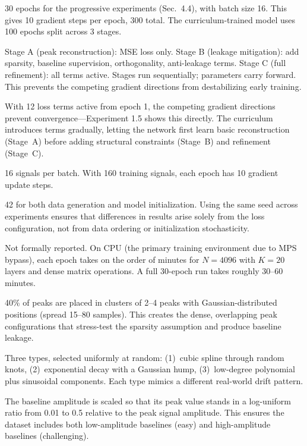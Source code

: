 \documentclass[11pt, letterpaper]{article}
\begin{document}
{30 epochs for the progressive experiments (Sec.~4.4), with batch size 16.  This gives 10 gradient steps per epoch, 300 total.  The curriculum-trained model uses 100 epochs split across 3 stages.}

{Stage A (peak reconstruction): MSE loss only.  Stage B (leakage mitigation): add sparsity, baseline supervision, orthogonality, anti-leakage terms.  Stage C (full refinement): all terms active.  Stages run sequentially; parameters carry forward.  This prevents the competing gradient directions from destabilizing early training.}

{With 12 loss terms active from epoch 1, the competing gradient directions prevent convergence---Experiment 1.5 shows this directly.  The curriculum introduces terms gradually, letting the network first learn basic reconstruction (Stage~A) before adding structural constraints (Stage~B) and refinement (Stage~C).}

{16 signals per batch.  With 160 training signals, each epoch has 10 gradient update steps.}

{42 for both data generation and model initialization.  Using the same seed across experiments ensures that differences in results arise solely from the loss configuration, not from data ordering or initialization stochasticity.}

{Not formally reported.  On CPU (the primary training environment due to MPS bypass), each epoch takes on the order of minutes for $N = 4096$ with $K = 20$ layers and dense matrix operations.  A full 30-epoch run takes roughly 30--60 minutes.}

{40\% of peaks are placed in clusters of 2--4 peaks with Gaussian-distributed positions (spread 15--80 samples).  This creates the dense, overlapping peak configurations that stress-test the sparsity assumption and produce baseline leakage.}

{Three types, selected uniformly at random: (1)~cubic spline through random knots, (2)~exponential decay with a Gaussian hump, (3)~low-degree polynomial plus sinusoidal components.  Each type mimics a different real-world drift pattern.}

{The baseline amplitude is scaled so that its peak value stands in a log-uniform ratio from 0.01 to 0.5 relative to the peak signal amplitude.  This ensures the dataset includes both low-amplitude baselines (easy) and high-amplitude baselines (challenging).}
\end{document}
